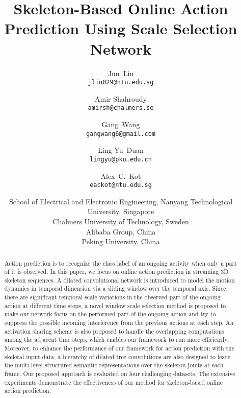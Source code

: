 \documentclass[10pt,twocolumn,letterpaper]{article}
\begin{document}
\title{Skeleton-Based Online Action Prediction Using Scale Selection Network}

\author{Jun~Liu\\{\tt\small jliu029@ntu.edu.sg}
  \and Amir Shahroudy\\{\tt\small amirsh@chalmers.se}
  \and Gang~Wang\\{\tt\small gangwang6@gmail.com}
	\and Ling-Yu~Duan\\{\tt\small lingyu@pku.edu.cn}
  \and Alex~C.~Kot\\{\tt\small eackot@ntu.edu.sg}
	\and  School of Electrical and Electronic Engineering, Nanyang Technological University, Singapore
   \\ Chalmers University of Technology, Sweden
   \\ Alibaba Group, China \hspace{20pt} 
   \\ Peking University, China
}


\maketitle


\begin{abstract}
   Action prediction is to recognize the class label of an ongoing activity when only a part of it is observed.
   In this paper, we focus on online action prediction in streaming 3D skeleton sequences.
   A dilated convolutional network is introduced to model the motion dynamics in temporal dimension via a sliding window over the temporal axis.
   Since there are significant temporal scale variations in the observed part of the ongoing action at different time steps,
   a novel window scale selection method is proposed to make our network focus on the performed part of the ongoing action and try to suppress the possible incoming interference from the previous actions
   at each step.
An activation sharing scheme is also proposed to handle the overlapping computations among the adjacent time steps,
   which enables our framework to run more efficiently.
Moreover, to enhance the performance of our framework for action prediction with the skeletal input data,
   a hierarchy of dilated tree convolutions are also designed to learn the multi-level structured semantic representations over the skeleton joints at each frame.
   Our proposed approach is evaluated on four challenging datasets.
   The extensive experiments demonstrate the effectiveness of our method for skeleton-based online action prediction.  
\end{abstract}
\end{document}
